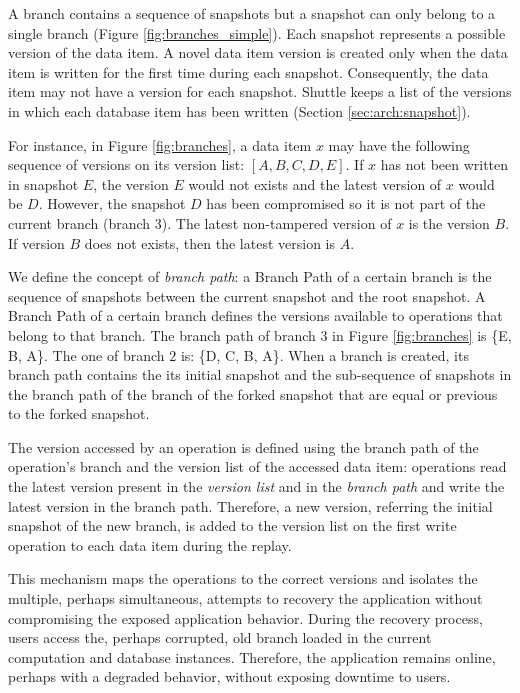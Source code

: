 A branch contains a sequence of snapshots but a snapshot can only belong to a single branch (Figure \ref{fig:branches_simple}). Each snapshot represents a possible version of the data item. A novel data item version is created only when the data item is written for the first time during each snapshot. Consequently, the data item may not have a version for each snapshot. Shuttle keeps a list of the versions in which each database item has been written (Section \ref{sec:arch:snapshot}).

For instance, in Figure \ref{fig:branches}, a data item $x$ may have the following sequence of versions on its version list: $[A,B,C,D,E]$. If $x$ has not been written in snapshot $E$, the version $E$ would not exists and the latest version of $x$ would be $D$. However, the snapshot $D$ has been compromised so it is not part of the current branch (branch 3). The latest non-tampered version of $x$ is the version $B$. If version $B$ does not exists, then the latest version is $A$.

We define the concept of \emph{branch path}:  a Branch Path of a certain branch is the sequence of snapshots between the current snapshot and the root snapshot. A Branch Path of a certain branch defines the versions available to operations that belong to that branch. The branch path of branch $3$ in Figure \ref{fig:branches} is \{E, B, A\}. The one of branch $2$ is: \{D, C, B, A\}. When a branch is created, its branch path contains the its initial snapshot and the sub-sequence of snapshots in the branch path of the branch of the forked snapshot that are equal or previous to the forked snapshot.

The version accessed by an operation is defined using the branch path of the operation's branch and the version list of the accessed data item: operations read the latest version present in the \emph{version list} and in the \emph{branch path} and write the latest version in the branch path. Therefore, a new version, referring the initial snapshot of the new branch, is added to the version list on the first write operation to each data item during the replay.

This mechanism maps the operations to the correct versions and isolates the multiple, perhaps simultaneous, attempts to recovery the application without compromising the exposed application behavior. During the recovery process, users access the, perhaps corrupted, old branch loaded in the current computation and database instances. Therefore, the application remains online, perhaps with a degraded behavior, without exposing downtime to users.

